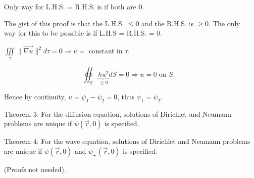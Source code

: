 \documentclass{report}
\begin{document}
Only way for L.H.S. = R.H.S. is if both are $0$.

The gist of this proof is that the L.H.S. $\leqslant 0$ and the R.H.S. is $\geqslant 0$. The only way for this to be possible is if L.H.S = R.H.S. = 0.

$\iiint\limits_{\tau}\|\overrightarrow{\nabla u}\|^{2} d \tau=0 \Rightarrow u=$ constant in $\tau$.

$$
\oiint_{S} \underbrace{h u^{2}}_{\geqslant 0} d S=0 \Rightarrow u=0 \text { on } S.
$$

Hence by continuity, $u=\psi_{1}-\psi_{2}=0$, thus $\psi_{1}=\psi_{2}$.

Theorem 3: For the diffusion equation, solutions of Dirichlet and Neumann problems are unique if $\psi(\vec{r}, 0)$ is specified.

Theorem 4: For the wave equation, solutions of Dirichlet and Neumann problems are unique if $\psi(\vec{r}, 0)$ and $\psi_{+}(\vec{r}, 0)$ is specified.

(Proofs not needed).
\end{document}
